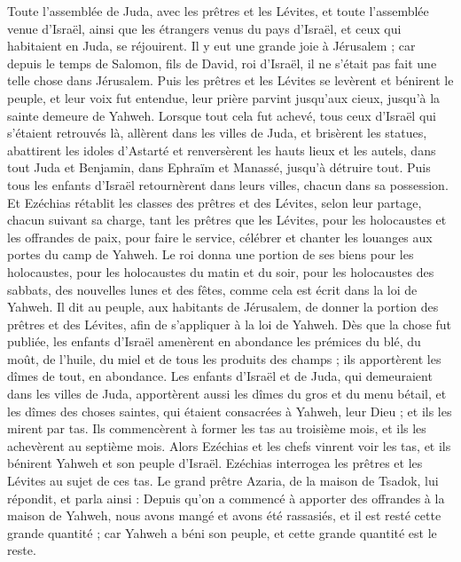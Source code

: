 \begin{multicols}{2}
Toute l'assemblée de Juda, avec les prêtres et les Lévites, et toute l'assemblée venue d'Israël, ainsi que les étrangers venus du pays d'Israël, et ceux qui habitaient en Juda, se réjouirent.
Il y eut une grande joie à Jérusalem ; car depuis le temps de Salomon, fils de David, roi d'Israël, il ne s'était pas fait une telle chose dans Jérusalem.
Puis les prêtres et les Lévites se levèrent et bénirent le peuple, et leur voix fut entendue, leur prière parvint jusqu'aux cieux, jusqu'à la sainte demeure de Yahweh.
\VerseOne{}Lorsque tout cela fut achevé, tous ceux d'Israël qui s'étaient retrouvés là, allèrent dans les villes de Juda, et brisèrent les statues, abattirent les idoles d'Astarté et renversèrent les hauts lieux et les autels, dans tout Juda et Benjamin, dans Ephraïm et Manassé, jusqu'à détruire tout. Puis tous les enfants d'Israël retournèrent dans leurs villes, chacun dans sa possession.
Et Ezéchias rétablit les classes des prêtres et des Lévites, selon leur partage, chacun suivant sa charge, tant les prêtres que les Lévites, pour les holocaustes et les offrandes de paix, pour faire le service, célébrer et chanter les louanges aux portes du camp de Yahweh.
Le roi donna une portion de ses biens pour les holocaustes, pour les holocaustes du matin et du soir, pour les holocaustes des sabbats, des nouvelles lunes et des fêtes, comme cela est écrit dans la loi de Yahweh.
Il dit au peuple, aux habitants de Jérusalem, de donner la portion des prêtres et des Lévites, afin de s'appliquer à la loi de Yahweh.
Dès que la chose fut publiée, les enfants d'Israël amenèrent en abondance les prémices du blé, du moût, de l'huile, du miel et de tous les produits des champs ; ils apportèrent les dîmes de tout, en abondance.
Les enfants d'Israël et de Juda, qui demeuraient dans les villes de Juda, apportèrent aussi les dîmes du gros et du menu bétail, et les dîmes des choses saintes, qui étaient consacrées à Yahweh, leur Dieu ; et ils les mirent par tas.
Ils commencèrent à former les tas au troisième mois, et ils les achevèrent au septième mois.
Alors Ezéchias et les chefs vinrent voir les tas, et ils bénirent Yahweh et son peuple d'Israël.
Ezéchias interrogea les prêtres et les Lévites au sujet de ces tas.
Le grand prêtre Azaria, de la maison de Tsadok, lui répondit, et parla ainsi : Depuis qu'on a commencé à apporter des offrandes à la maison de Yahweh, nous avons mangé et avons été rassasiés, et il est resté cette grande quantité ; car Yahweh a béni son peuple, et cette grande quantité est le reste.

\end{multicols}
